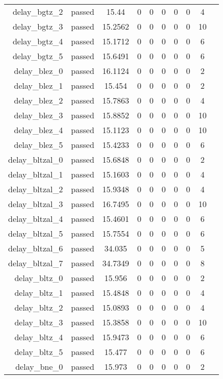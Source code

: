 \begin{longtable}{r|ccccccccc}
    delay\_bgtz\_2 & passed & 15.44 & 0 & 0 & 0 & 0 & 0 & 4 \\
    delay\_bgtz\_3 & passed & 15.2562 & 0 & 0 & 0 & 0 & 0 & 10 \\
    delay\_bgtz\_4 & passed & 15.1712 & 0 & 0 & 0 & 0 & 0 & 6 \\
    delay\_bgtz\_5 & passed & 15.6491 & 0 & 0 & 0 & 0 & 0 & 6 \\
    delay\_blez\_0 & passed & 16.1124 & 0 & 0 & 0 & 0 & 0 & 2 \\
    delay\_blez\_1 & passed & 15.454 & 0 & 0 & 0 & 0 & 0 & 2 \\
    delay\_blez\_2 & passed & 15.7863 & 0 & 0 & 0 & 0 & 0 & 4 \\
    delay\_blez\_3 & passed & 15.8852 & 0 & 0 & 0 & 0 & 0 & 10 \\
    delay\_blez\_4 & passed & 15.1123 & 0 & 0 & 0 & 0 & 0 & 10 \\
    delay\_blez\_5 & passed & 15.4233 & 0 & 0 & 0 & 0 & 0 & 6 \\
    delay\_bltzal\_0 & passed & 15.6848 & 0 & 0 & 0 & 0 & 0 & 2 \\
    delay\_bltzal\_1 & passed & 15.1603 & 0 & 0 & 0 & 0 & 0 & 4 \\
    delay\_bltzal\_2 & passed & 15.9348 & 0 & 0 & 0 & 0 & 0 & 4 \\
    delay\_bltzal\_3 & passed & 16.7495 & 0 & 0 & 0 & 0 & 0 & 10 \\
    delay\_bltzal\_4 & passed & 15.4601 & 0 & 0 & 0 & 0 & 0 & 6 \\
    delay\_bltzal\_5 & passed & 15.7554 & 0 & 0 & 0 & 0 & 0 & 6 \\
    delay\_bltzal\_6 & passed & 34.035 & 0 & 0 & 0 & 0 & 0 & 5 \\
    delay\_bltzal\_7 & passed & 34.7349 & 0 & 0 & 0 & 0 & 0 & 8 \\
    delay\_bltz\_0 & passed & 15.956 & 0 & 0 & 0 & 0 & 0 & 2 \\
    delay\_bltz\_1 & passed & 15.4848 & 0 & 0 & 0 & 0 & 0 & 4 \\
    delay\_bltz\_2 & passed & 15.0893 & 0 & 0 & 0 & 0 & 0 & 4 \\
    delay\_bltz\_3 & passed & 15.3858 & 0 & 0 & 0 & 0 & 0 & 10 \\
    delay\_bltz\_4 & passed & 15.9473 & 0 & 0 & 0 & 0 & 0 & 6 \\
    delay\_bltz\_5 & passed & 15.477 & 0 & 0 & 0 & 0 & 0 & 6 \\
    delay\_bne\_0 & passed & 15.973 & 0 & 0 & 0 & 0 & 0 & 2 \\

\end{longtable}
